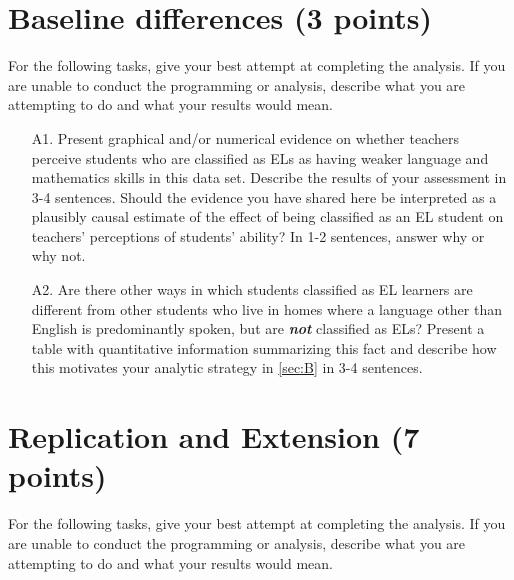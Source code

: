 \documentclass[a4paper, 11pt]{article}
\begin{document}
\section{Baseline differences  (3 points)}
For the following tasks, give your best attempt at completing the analysis. If you are unable to conduct the programming or analysis, describe what you are attempting to do and what your results would mean.

\begin{enumerate}
	\item[A1.] Present graphical and/or numerical evidence on whether teachers perceive students who are classified as ELs as having weaker language and mathematics skills in this data set. Describe the results of your assessment in 3-4 sentences. Should the evidence you have shared here be interpreted as a plausibly causal estimate of the effect of being classified as an EL student on teachers' perceptions of students' ability? In 1-2 sentences, answer why or why not.
	\item[A2.] Are there other ways in which students classified as EL learners are different from other students who live in homes where a language other than English is predominantly spoken, but are \textbf{\textit{not}} classified as ELs? Present a table with quantitative information summarizing this fact and describe how this motivates your analytic strategy in \autoref{sec:B} in 3-4 sentences.

\end{enumerate}

\section{Replication and Extension (7 points)} \label{sec:B}
For the following tasks, give your best attempt at completing the analysis. If you are unable to conduct the programming or analysis, describe what you are attempting to do and what your results would mean. 
\end{document}
